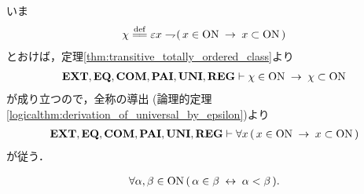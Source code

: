 	\begin{prf}
		いま
		\begin{align}
			\chi \defeq \varepsilon x \negation 
			(\, x \in \ON \rarrow x \subset \ON\, )
		\end{align}
		とおけば，定理\ref{thm:transitive_totally_ordered_class}より
		\begin{align}
			\mbox{{\bf EXT}},\mbox{{\bf EQ}},\mbox{\bf COM},\mbox{{\bf PAI}},\mbox{{\bf UNI}},\mbox{{\bf REG}} \vdash 
			\chi \in \mathrm{ON} \hspace{0.25em}\rightarrow\hspace{0.25em} \chi \subset \mathrm{ON}
		\end{align}
		が成り立つので，全称の導出
		(論理的定理\ref{logicalthm:derivation_of_universal_by_epsilon})より
		\begin{align}
			\mbox{{\bf EXT}},\mbox{{\bf EQ}},\mbox{\bf COM},\mbox{{\bf PAI}},\mbox{{\bf UNI}},\mbox{{\bf REG}} \vdash 
			\forall x\, (\, x \in \mathrm{ON} \hspace{0.25em}\rightarrow\hspace{0.25em} x \subset \mathrm{ON}\, )
		\end{align}
		が従う．
		\QED
	\end{prf}
	
	\begin{screen}
		\begin{thm}
		\label{thm:element_and_proper_subset_correspond_between_ordinal_numbers}
			\begin{align}
				\forall \alpha,\beta \in \mathrm{ON}\,
				(\, \alpha \in \beta \hspace{0.25em}\leftrightarrow\hspace{0.25em} \alpha < \beta\, ).
			\end{align}
		\end{thm}
	\end{screen}
	
